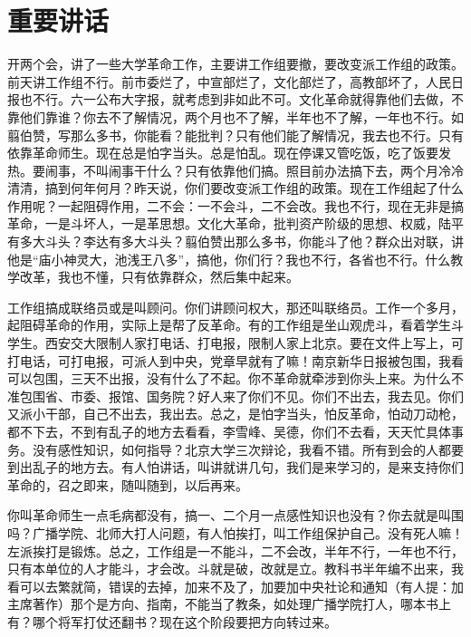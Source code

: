 \section[重要讲话（一九六六年七月二十一日）]{重要讲话}


开两个会，讲了一些大学革命工作，主要讲工作组要撤，要改变派工作组的政策。前天讲工作组不行。前市委烂了，中宣部烂了，文化部烂了，高教部坏了，人民日报也不行。六一公布大字报，就考虑到非如此不可。文化革命就得靠他们去做，不靠他们靠谁？你去不了解情况，两个月也不了解，半年也不了解，一年也不行。如翦伯赞，写那么多书，你能看？能批判？只有他们能了解情况，我去也不行。只有依靠革命师生。现在总是怕字当头。总是怕乱。现在停课又管吃饭，吃了饭要发热。要闹事，不叫闹事干什么？只有依靠他们搞。照目前办法搞下去，两个月冷冷清清，搞到何年何月？昨天说，你们要改变派工作组的政策。现在工作组起了什么作用呢？一起阻碍作用，二不会：一不会斗，二不会改。我也不行，现在无非是搞革命，一是斗坏人，一是革思想。文化大革命，批判资产阶级的思想、权威，陆平有多大斗头？李达有多大斗头？翦伯赞出那么多书，你能斗了他？群众出对联，讲他是“庙小神灵大，池浅王八多”，搞他，你们行？我也不行，各省也不行。什么教学改革，我也不懂，只有依靠群众，然后集中起来。

工作组搞成联络员或是叫顾问。你们讲顾问权大，那还叫联络员。工作一个多月，起阻碍革命的作用，实际上是帮了反革命。有的工作组是坐山观虎斗，看着学生斗学生。西安交大限制人家打电话、打电报，限制人家上北京。要在文件上写上，可打电话，可打电报，可派人到中央，党章早就有了嘛！南京新华日报被包围，我看可以包围，三天不出报，没有什么了不起。你不革命就牵涉到你头上来。为什么不准包围省、市委、报馆、国务院？好人来了你们不见。你们不出去，我去见。你们又派小干部，自己不出去，我出去。总之，是怕字当头，怕反革命，怕动刀动枪，都不下去，不到有乱子的地方去看看，李雪峰、吴德，你们不去看，天天忙具体事务。没有感性知识，如何指导？北京大学三次辩论，我看不错。所有到会的人都要到出乱子的地方去。有人怕讲话，叫讲就讲几句，我们是来学习的，是来支持你们革命的，召之即来，随叫随到，以后再来。

你叫革命师生一点毛病都没有，搞一、二个月一点感性知识也没有？你去就是叫围吗？广播学院、北师大打人问题，有人怕挨打，叫工作组保护自己。没有死人嘛！左派挨打是锻炼。总之，工作组是一不能斗，二不会改，半年不行，一年也不行，只有本单位的人才能斗，才会改。斗就是破，改就是立。教科书半年编不出来，我看可以去繁就简，错误的去掉，加来不及了，加要加中央社论和通知（有人提：加主席著作）那个是方向、指南，不能当了教条，如处理广播学院打人，哪本书上有？哪个将军打仗还翻书？现在这个阶段要把方向转过来。

